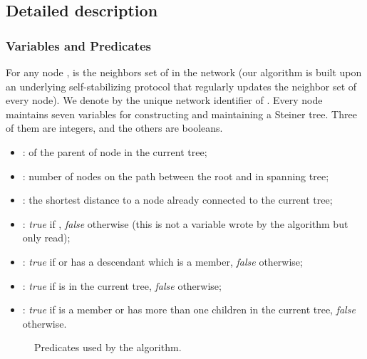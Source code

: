 \documentclass[11pt]{article}
\begin{document}
\subsection{Detailed description}



\subsubsection{Variables and Predicates}

For any node ,  is the neighbors set of  in the network  (our algorithm is built upon an underlying self-stabilizing protocol that regularly updates the neighbor set of every node). We denote by  the unique network identifier of . Every node  maintains seven variables for constructing and maintaining a Steiner tree. Three of them are integers, and the others are booleans.

\begin{itemize}
\item :  of the parent of node  in the current tree;
\item : number of nodes on the path between the root and 
in spanning tree;
\item : the shortest distance to a node already connected to the current tree;
\item : \emph{true} if , \emph{false} otherwise (this is not a variable wrote by the algorithm but only read);
\item : \emph{true} if  or  has a descendant which is a member, \emph{false} otherwise;
\item : \emph{true} if  is in the current tree, \emph{false} otherwise;
\item : \emph{true} if  is a member or  has more than one children in the current tree, \emph{false} otherwise.
\end{itemize}

\begin{small}
\begin{figure*}
\scalebox{1}
{
\fbox{
\begin{minipage}{15.7cm}
\footnotesize{
\begin{description}
\item[] 
\item[]
\item[] 
\item[]
\item[]
\item[]
\item[]
\item[]
\item[]
\item[]
\end{description}
}
\end{minipage}
}
}
\caption{Predicates used by the algorithm.}
\label{fig:algo_predicates}
\end{figure*}
\end{small}
\end{document}
